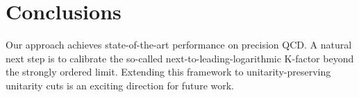 \section{Conclusions}\label{sec:conclusions}

Our approach achieves state-of-the-art performance on precision QCD. A
natural next step is to calibrate the so-called
next-to-leading-logarithmic K-factor beyond the strongly ordered limit.
Extending this framework to unitarity-preserving unitarity cuts is an
exciting direction for future work.

